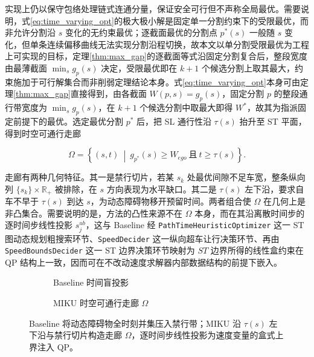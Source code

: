 \documentclass[a4paper,11pt]{ctexart}
\theoremstyle{definition}
\begin{document}
实现上仍以保守包络处理链式连通分量，保证安全可行但不声称全局最优。需要说明，式\eqref{eq:time_varying_opt}的极大极小解是固定单一分割约束下的受限最优，而非允许分割沿 $s$ 变化的无约束最优；逐截面最优的分割点 $p^{*}(s)$ 一般随 $s$ 变化，但单条连续偏移曲线无法实现分割沿程切换，故本文以单分割受限最优为工程上可实现的目标，定理\ref{thm:max_gap}的逐截面等式沿固定分割复合后，整段宽度由最薄截面 $\min_s g_p(s)$ 决定，受限最优即在 $k+1$ 个候选分割上取其最大，约束施加于可行解集合而非削弱定理结论本身。式\eqref{eq:time_varying_opt}本身可由定理\ref{thm:max_gap}直接得到，由各截面 $W(p,s)=g_p(s)$，固定分割 $p$ 的整段通行带宽度为 $\min_s g_p(s)$，在 $k+1$ 个候选分割中取最大即得 $W^{*}$，故其为指派固定前提下的最优。选定最优分割 $p^{*}$ 后，把 SL 通行性沿 $\tau(s)$ 抬升至 ST 平面，得到时空可通行走廊

\begin{equation}
    \Omega = \left\{ (s,t) \ \middle|\ g_{p^{*}}(s) \geq W_{ego}\ \text{且}\ t \geq \tau(s) \right\}.
    \label{eq:st_corridor}
\end{equation}

走廊有两种几何特征。其一是禁行切片，若某 $s_k$ 处最优间隙不足车宽，整条纵向列 $\{s_k\}\times\mathbb{R}_{+}$ 被排除，在 $s$ 方向表现为水平缺口。其二是 $\tau(s)$ 左下沿，要求自车不早于 $\tau(s)$ 到达 $s$，为动态障碍物移开预留时间。两者组合使 $\Omega$ 在几何上是非凸集合。需要说明的是，方法的凸性来源不在 $\Omega$ 本身，而在其沿离散时间步的逐时间步线性投影 $s_j^{ub}$，这与 Baseline 经 \texttt{PathTimeHeuristicOptimizer} 这一 ST 图动态规划粗搜索环节、\texttt{SpeedDecider} 这一纵向超车让行决策环节、再由 \texttt{SpeedBoundsDecider} 这一 ST 边界决策环节映射为 $ST$ 边界所得的线性盒约束在 QP 结构上一致，因而可在不改动速度求解器内部数据结构的前提下嵌入。

\begin{figure}[htbp]
\centering
\begin{subfigure}[b]{0.46\textwidth}
  \centering
  \caption{Baseline 时间盲投影}
\end{subfigure}\hfill
\begin{subfigure}[b]{0.46\textwidth}
  \centering
  \caption{MIKU 时空可通行走廊 $\Omega$}
\end{subfigure}
\caption{ST 平面上的时空可通行走廊与上界收紧}
\caption*{Baseline 将动态障碍物全时刻并集压入禁行带；MIKU 沿 $\tau(s)$ 左下沿与禁行切片构造走廊 $\Omega$，逐时间步线性投影为速度变量的盒式上界注入 QP。}
\label{fig:corridor}
\end{figure}
\end{document}
